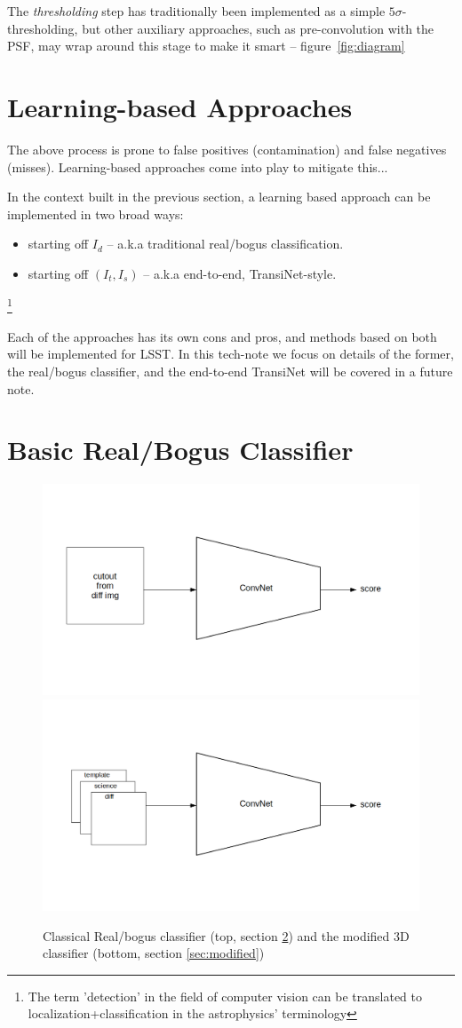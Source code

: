 The \emph{thresholding} step has traditionally been implemented as a simple $5\sigma$-thresholding, but other auxiliary approaches, such as pre-convolution with the PSF, may wrap around this stage to make it smart -- figure~\ref{fig:diagram}


\section{Learning-based Approaches}
\label{sec:learning}
The above process is prone to false positives (contamination) and false negatives (misses). Learning-based approaches come into play to mitigate this...

In the context built in the previous section, a learning based approach can be implemented in two broad ways:
\begin{itemize}
\item starting off $I_d$ -- a.k.a traditional real/bogus classification.
\item starting off $(I_t,I_s)$ -- a.k.a end-to-end, TransiNet-style.
\end{itemize}

\footnote{The term 'detection' in the field of computer vision can be translated to localization+classification in the astrophysics' terminology}


Each of the approaches has its own cons and pros, and methods based on both will be implemented for LSST. In this tech-note we focus on details of the former, the real/bogus classifier, and the end-to-end TransiNet will be covered in a future note.


\section{Basic Real/Bogus Classifier}
\label{sec:basic}

\begin{figure}[h]
  \centering
  \includegraphics[width=.6\textwidth]{material/rb-classifier}
  \includegraphics[width=.6\textwidth]{material/rb-classifier-mod}
  \caption{Classical Real/bogus classifier (top, section \ref{sec:basic}) and the modified 3D classifier (bottom, section \ref{sec:modified})}
  \label{fig:rbdiagram}
\end{figure}

